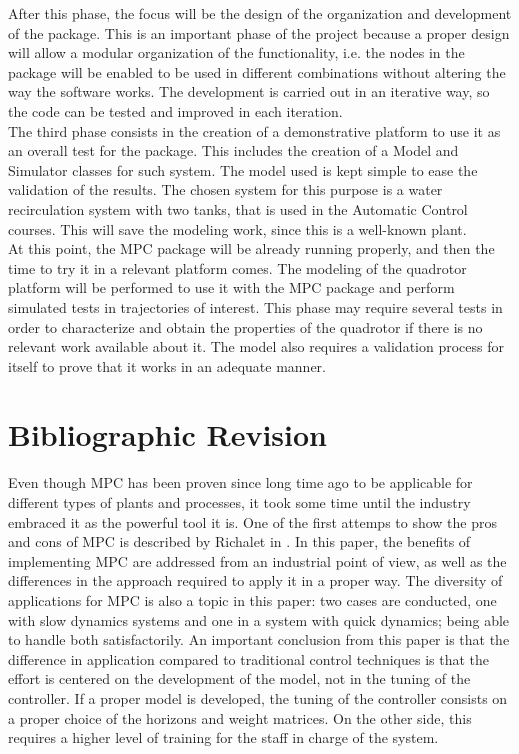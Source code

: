 After this phase, the focus will be the design of the organization and development of the package. This is an important phase of the project because a proper design will allow a modular organization of the functionality, i.e. the nodes in the package will be enabled to be used in different combinations without altering the way the software works. The development is carried out in an iterative way, so the code can be tested and improved in each iteration. \\

The third phase consists in the creation of a demonstrative platform to use it as an overall test for the package. This includes the creation of a Model and Simulator classes for such system. The model used is kept simple to ease the validation of the results. The chosen system for this purpose is a water recirculation system with two tanks, that is used in the Automatic Control courses. This will save the modeling work, since this is a well-known plant. \\

At this point, the MPC package will be already running properly, and then the time to try it in a relevant platform comes. The modeling of the quadrotor platform will be performed to use it with the MPC package and perform simulated tests in trajectories of interest. This phase may require several tests in order to characterize and obtain the properties of the quadrotor if there is no relevant work available about it. The model also requires a validation process for itself to prove that it works in an adequate manner. 

\section{Bibliographic Revision}

Even though MPC has been proven since long time ago to be applicable for different types of plants and processes, it took some time until the industry embraced it as the powerful tool it is. One of the first attemps to show the pros and cons of MPC is described  by Richalet in \cite{Richalet1993}. In this paper, the benefits of implementing MPC are addressed from an industrial point of view, as well as the differences in the approach required to apply it in a proper way. The diversity of applications for MPC is also a topic in this paper: two cases are conducted, one with slow dynamics systems and one in a system with quick dynamics; being able to handle both satisfactorily. An important conclusion from this paper is that the difference in application compared to traditional control techniques is that the effort is centered on the development of the model, not in the tuning of the controller. If a proper model is developed, the tuning of the controller consists on a proper choice of the horizons and weight matrices. On the other side, this requires a higher level of training for the staff in charge of the system.\\


